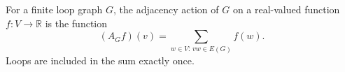 \begin{definition}
For a finite loop graph \(G\), the adjacency action of \(G\) on a real-valued function \(f\colon V\to \mathbb R\) is the function
\[
  (A_G f)(v)=\sum_{w\in V:\,vw\in E(G)} f(w).
\]
Loops are included in the sum exactly once.
\end{definition}
